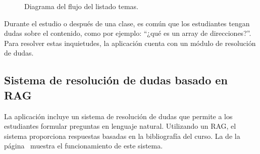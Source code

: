 \begin{figure}[h!]
  \centering
\caption{Diagrama del flujo del listado temas.}\label{fig:topics}
\end{figure}

Durante el estudio o después de una clase, es común que los estudiantes tengan dudas sobre el contenido, como por ejemplo: ``¿qué es un array de direcciones?''. Para resolver estas inquietudes, la aplicación cuenta con un módulo de resolución de dudas.

\subsection{Sistema de resolución de dudas basado en RAG}

La aplicación incluye un sistema de resolución de dudas que permite a los estudiantes formular preguntas en lenguaje natural. Utilizando un RAG, el sistema proporciona respuestas basadas en la bibliografía del curso. La  de la página~\pageref{fig:q-a-diagram} muestra el funcionamiento de este sistema.

